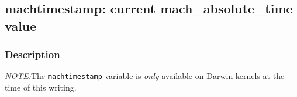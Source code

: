 \clearpage
{}
{}
\label{vars:machtimestamp}
\subsection*{machtimestamp: current mach\_absolute\_time value}

\subsubsection*{Description}

\emph{NOTE:}The \verb|machtimestamp| variable is \emph{only} available
on Darwin kernels at the time of this writing.

